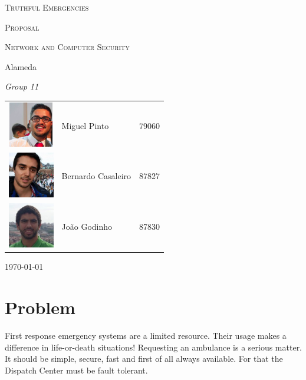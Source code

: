 \documentclass[a4paper,titlepage,11pt]{article}
\begin{document}
\begin{titlepage}
  \begin{center}
    {\scshape \huge Truthful Emergencies \par}
    \vspace{1cm}

    {\scshape \LARGE Proposal \par}
    \vspace{1.5cm}

    {\scshape \Large Network and Computer Security \par}
    \vspace{0.5cm}

    {\Large Alameda \par}
    \vfill

    {\itshape \Large Group 11 \par}
    \vfill

    \begin{tabular}{l l l}
      \includegraphics[width=20mm, height=20mm]{img/miguel.png} & Miguel Pinto & 79060\\
      \includegraphics[width=20mm, height=20mm]{img/bernardo.jpeg} & Bernardo Casaleiro & 87827\\
      \includegraphics[width=20mm, height=20mm]{img/joao.jpeg} & João Godinho & 87830\\
    \end{tabular}
    \vfill

    {\large \today\par}
  \end{center}
\end{titlepage}

\section{Problem}
First response emergency systems are a limited resource. Their usage makes a difference in life-or-death situations!
Requesting an ambulance is a serious matter.
It should be simple, secure, fast and first of all always available.
For that the Dispatch Center must be fault tolerant.
\end{document}
